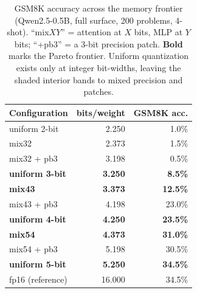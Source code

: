 \documentclass[11pt]{article}
\newcommand{\bpw}{bits/weight}
\begin{document}
\begin{table}[t]
\centering
\caption{GSM8K accuracy across the memory frontier (Qwen2.5-0.5B, full
surface, 200 problems, 4-shot). ``mix$XY$'' = attention at $X$ bits, MLP at $Y$
bits; ``+pb3'' = a 3-bit precision patch. \textbf{Bold} marks the Pareto
frontier. Uniform quantization exists only at integer bit-widths, leaving the
shaded interior bands to mixed precision and patches.}
\label{tab:frontier}
\begin{tabular}{lrr}
\toprule
Configuration & \bpw{} & GSM8K acc. \\
\midrule
uniform 2-bit & 2.250 & 1.0\% \\
mix32 & 2.373 & 1.5\% \\
mix32 + pb3 & 3.198 & 0.5\% \\
\textbf{uniform 3-bit} & \textbf{3.250} & \textbf{8.5\%} \\
\textbf{mix43} & \textbf{3.373} & \textbf{12.5\%} \\
mix43 + pb3 & 4.198 & 23.0\% \\
\textbf{uniform 4-bit} & \textbf{4.250} & \textbf{23.5\%} \\
\textbf{mix54} & \textbf{4.373} & \textbf{31.0\%} \\
mix54 + pb3 & 5.198 & 30.5\% \\
\textbf{uniform 5-bit} & \textbf{5.250} & \textbf{34.5\%} \\
\midrule
fp16 (reference) & 16.000 & 34.5\% \\
\bottomrule
\end{tabular}
\end{table}
\end{document}
